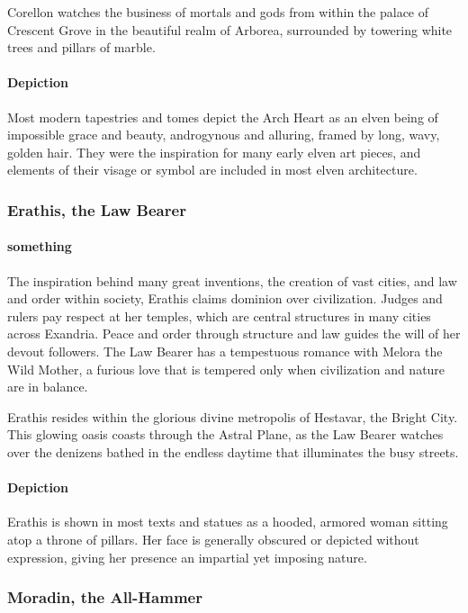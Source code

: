 \documentclass[letterpaper,twocolumn,openany,nodeprecatedcode]{dndbook}
\begin{document}
Corellon watches the business of mortals and gods from within the palace of Crescent
Grove in the beautiful realm of Arborea, surrounded by towering white trees and
pillars of marble.

\paragraph{Depiction}
Most modern tapestries and tomes depict the Arch Heart as an elven being of impossible
grace and beauty, androgynous and alluring, framed by long, wavy, golden hair. They were
the inspiration for many early elven art pieces, and elements of their visage or symbol
are included in most elven architecture.

\subsubsection{Erathis, the Law Bearer}

\paragraph{something}
The inspiration behind many great inventions, the creation of vast cities, and law and
order within society, Erathis claims dominion over civilization. Judges and rulers pay
respect at her temples, which are central structures in many cities across Exandria.
Peace and order through structure and law guides the will of her devout followers.
The Law Bearer has a tempestuous romance with Melora the Wild Mother, a furious love
that is tempered only when civilization and nature are in balance.

Erathis resides within the glorious divine metropolis of Hestavar, the Bright City.
This glowing oasis coasts through the Astral Plane, as the Law Bearer watches over the
denizens bathed in the endless daytime that illuminates the busy streets.

\paragraph{Depiction}
Erathis is shown in most texts and statues as a hooded, armored woman sitting atop a
throne of pillars. Her face is generally obscured or depicted without expression,
giving her presence an impartial yet imposing nature.

\subsubsection{Moradin, the All-Hammer}
\end{document}
